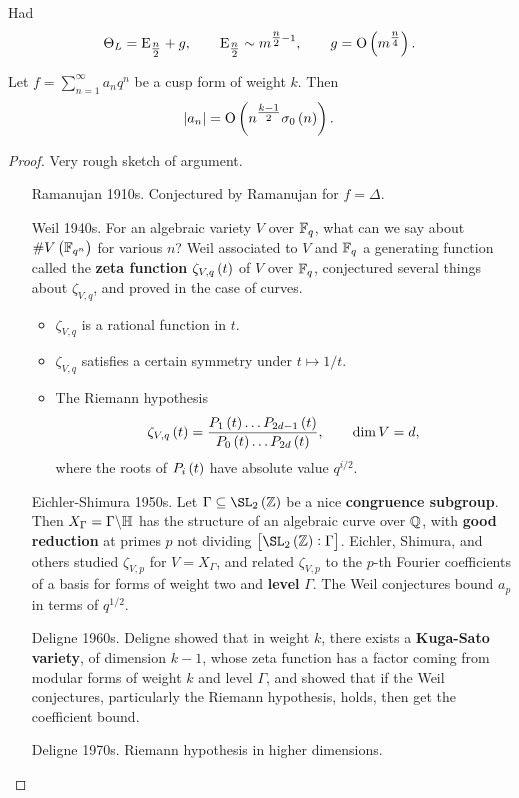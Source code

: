 Had
$$ \Theta_L = \E_{\tfrac{n}{2}} + g, \qquad \E_{\tfrac{n}{2}} \sim m^{\tfrac{n}{2} - 1}, \qquad g = \O\br{m^{\tfrac{n}{4}}}. $$

\begin{theorem}[Deligne]
Let $ f = \sum_{n = 1}^\infty a_nq^n $ be a cusp form of weight $ k $. Then
$$ \abs{a_n} = \O\br{n^{\tfrac{k - 1}{2}}\sigma_0\br{n}}. $$
\end{theorem}

\begin{proof}
Very rough sketch of argument.
\begin{itemize}[leftmargin=1in]
\item[Ramanujan 1910s.] Conjectured by Ramanujan for $ f = \Delta $.
\item[Weil 1940s.] For an algebraic variety $ V $ over $ \mathbb{F}_q $, what can we say about $ \#V\br{\FF_{q^n}} $ for various $ n $? Weil associated to $ V $ and $ \mathbb{F}_q $ a generating function called the \textbf{zeta function} $ \zeta_{V, q}\br{t} $ of $ V $ over $ \mathbb{F}_q $, conjectured several things about $ \zeta_{V, q} $, and proved in the case of curves.
\begin{itemize}
\item $ \zeta_{V, q} $ is a rational function in $ t $.
\item $ \zeta_{V, q} $ satisfies a certain symmetry under $ t \mapsto 1 / t $.
\item The Riemann hypothesis
$$ \zeta_{V, q}\br{t} = \dfrac{P_1\br{t} \dots P_{2d - 1}\br{t}}{P_0\br{t} \dots P_{2d}\br{t}}, \qquad \dim V = d, $$
where the roots of $ P_i\br{t} $ have absolute value $ q^{i / 2} $.
\end{itemize}
\item[Eichler-Shimura 1950s.] Let $ \Gamma \subseteq \SL_2\br{\ZZ} $ be a nice \textbf{congruence subgroup}. Then $ X_\Gamma = \Gamma \backslash \mathbb{H} $ has the structure of an algebraic curve over $ \mathbb{Q} $, with \textbf{good reduction} at primes $ p $ not dividing $ \sbr{\SL_2\br{\ZZ} : \Gamma} $. Eichler, Shimura, and others studied $ \zeta_{V, p} $ for $ V = X_\Gamma $, and related $ \zeta_{V, p} $ to the $ p $-th Fourier coefficients of a basis for forms of weight two and \textbf{level} $ \Gamma $. The Weil conjectures bound $ a_p $ in terms of $ q^{1 / 2} $.
\item[Deligne 1960s.] Deligne showed that in weight $ k $, there exists a \textbf{Kuga-Sato variety}, of dimension $ k - 1 $, whose zeta function has a factor coming from modular forms of weight $ k $ and level $ \Gamma $, and showed that if the Weil conjectures, particularly the Riemann hypothesis, holds, then get the coefficient bound.
\item[Deligne 1970s.] Riemann hypothesis in higher dimensions.
\end{itemize}
\end{proof}

